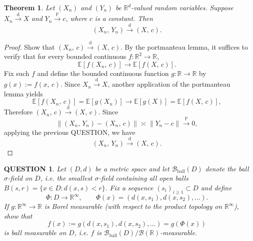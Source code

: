 \documentclass[12pt]{article}
\renewcommand{\(}{\left(}%
\renewcommand{\)}{\right)}%
\renewcommand{\[}{\left[}%
\renewcommand{\]}{\right]}%
\renewcommand{\r}{\mathbb{R}}
\newcommand{\p}{\mathbb{P}}
\newtheorem{question}{QUESTION}[section]}
\newtheorem{theorem}{Theorem}[section]}
\newtheorem{proof}{Proof.}}
\begin{document}
\begin{theorem}
Let $(X_n)$ and $(Y_n)$ be $\r^d$-valued random variables. Suppose $X_n \xrightarrow{\mathrm{d}} X$ and $Y_n \xrightarrow{\p} c$, where $c$ is a constant. Then
\begin{equation*}
 (X_n,\,Y_n) \xrightarrow{\mathrm{d}} (X,\,c).
\end{equation*}
\end{theorem}

\begin{proof}
 Show that $(X_n,\,c)\xrightarrow{\mathrm{d}}(X,\,c)$.
By the portmanteau lemma, it suffices to verify that for every bounded continuous $f:\mathbb{R}^2\to\mathbb{R}$,
\begin{equation*}
 \mathbb{E}\!\left[f(X_n,\,c)\right] \longrightarrow \mathbb{E}\!\left[f(X,\,c)\right].
\end{equation*}
Fix such $f$ and define the bounded continuous function $g:\mathbb{R}\to\mathbb{R}$ by $g(x):=f(x,\,c)$. Since $X_n\xrightarrow{\mathrm{d}}X$, another application of the portmanteau lemma yields
\begin{equation*}
 \mathbb{E}\!\left[f(X_n,\,c)\right]=\mathbb{E}[g(X_n)] \longrightarrow \mathbb{E}[g(X)]=\mathbb{E}\!\left[f(X,\,c)\right],
\end{equation*}
Therefore $(X_n,\,c)\xrightarrow{\mathrm{d}}(X,\,c)$.
Since
\begin{equation*}
 \|(X_n,\,Y_n)-(X_n,\,c)\| \asymp \|Y_n-c\| \xrightarrow{\p} 0,
\end{equation*}
applying the previous QUESTION, we have
\begin{equation*}
 (X_n,\,Y_n) \xrightarrow{\mathrm{d}} (X,\,c).
\end{equation*}
\end{proof}

\begin{question}
Let $(D,d)$ be a metric space and let $\mathcal B_{\mathrm{ball}}(D)$ denote the ball $\sigma$-field on $D$, i.e. the smallest $\sigma$-field containing all open balls $B(s,r)=\{x\in D:d(x,s)<r\}$. Fix a sequence $(s_i)_{i\ge1}\subset D$ and define
\begin{equation*}
\Phi:D\to \mathbb R^\infty,\qquad 
\Phi(x)=(d(x,s_1),d(x,s_2),\ldots).
\end{equation*}
If $g:\mathbb R^\infty\to\mathbb R$ is Borel measurable (with respect to the product topology on $\mathbb R^\infty$), show that
\begin{equation*}
f(x):=g(d(x,s_1),d(x,s_2),\ldots)=g(\Phi(x))
\end{equation*}
is ball measurable on $D$, i.e. $f$ is $\mathcal B_{\mathrm{ball}}(D)/\mathcal B(\mathbb R)$-measurable.
\end{question}
\end{document}
